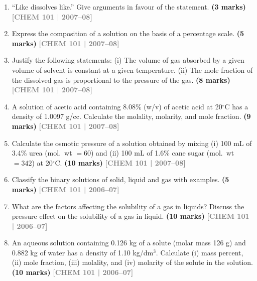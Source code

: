\documentclass[12pt,a3paper]{article}
\newcommand{\yr}[1]{\hfill\textcolor{gray}{\small\textbf{[#1]}}}
\newcommand{\mk}[1]{\textcolor{orange!70!black}{\small\textbf{(#1 marks)}}}
\begin{document}
\begin{enumerate}
\item ``Like dissolves like.'' Give arguments in favour of the statement. \mk{3}
\yr{CHEM 101 | 2007--08}



\item Express the composition of a solution on the basis of a percentage scale. \mk{5}
\yr{CHEM 101 | 2007--08}



\item Justify the following statements: (i) The volume of gas absorbed by a given volume of solvent is constant at a given temperature. (ii) The mole fraction of the dissolved gas is proportional to the pressure of the gas. \mk{8}
\yr{CHEM 101 | 2007--08}



\item A solution of acetic acid containing 8.08\% (w/v) of acetic acid at 20$^\circ$C has a density of 1.0097 g/cc. Calculate the molality, molarity, and mole fraction. \mk{9}
\yr{CHEM 101 | 2007--08}



\item Calculate the osmotic pressure of a solution obtained by mixing (i) 100 mL of 3.4\% urea (mol.\ wt $= 60$) and (ii) 100 mL of 1.6\% cane sugar (mol.\ wt $= 342$) at 20$^\circ$C. \mk{10}
\yr{CHEM 101 | 2007--08}



\item Classify the binary solutions of solid, liquid and gas with examples. \mk{5}
\yr{CHEM 101 | 2006--07}



\item What are the factors affecting the solubility of a gas in liquids? Discuss the pressure effect on the solubility of a gas in liquid. \mk{10}
\yr{CHEM 101 | 2006--07}



\item An aqueous solution containing 0.126 kg of a solute (molar mass 126 g) and 0.882 kg of water has a density of 1.10 kg/dm$^3$. Calculate (i) mass percent, (ii) mole fraction, (iii) molality, and (iv) molarity of the solute in the solution. \mk{10}
\yr{CHEM 101 | 2006--07}




\end{enumerate}
\end{document}
